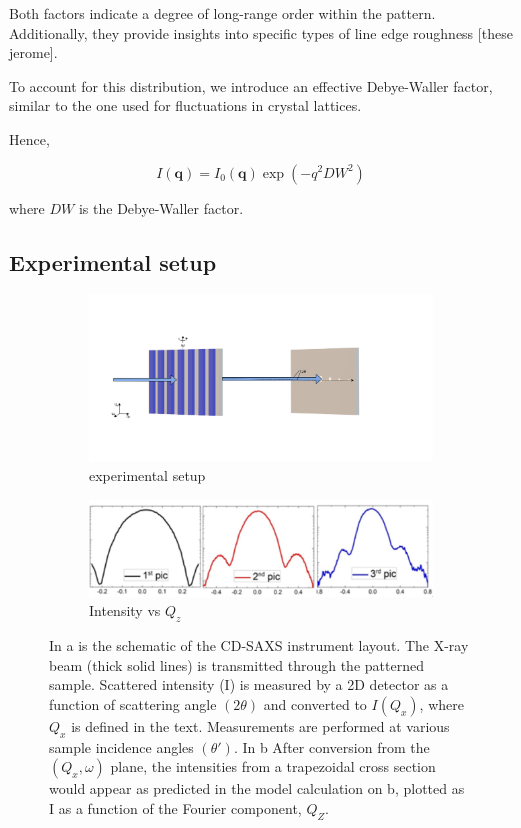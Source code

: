 Both factors indicate a degree of long-range order within the pattern. Additionally, they provide insights into specific types of line edge roughness [these jerome].

To account for this distribution, we introduce an effective Debye-Waller factor, similar to the one used for fluctuations in crystal lattices.

Hence,

\begin{equation}
    I(\mathbf{q}) = I_{0}(\mathbf{q}) \exp(-q^{2}DW^{2} )
\end{equation}

where $DW$ is the Debye-Waller factor.

\subsection{Experimental setup}
\begin{figure}[h]
    \centering
    \begin{subfigure}[b]{0.8\textwidth}
        \includegraphics[width=\textwidth]{images/cdsaxs_diff.png}
        \caption{experimental setup}
    \end{subfigure}
    
    \begin{subfigure}[b]{0.4\textwidth}
        \includegraphics[width=\textwidth]{images/intensity_qz.png}
        \caption{Intensity vs $Q_z$}
    \end{subfigure}
    
    \caption{In a is the schematic of the CD-SAXS instrument layout. The X-ray beam (thick solid lines) is transmitted through the 
    patterned sample. Scattered intensity (I) is measured by a 2D detector as a function of scattering angle $(2\theta)$ 
    and converted to $I(Q_{x})$, where $Q_{x}$ is defined in the text. Measurements are performed at various sample incidence 
    angles $(\theta')$. In b After conversion from the $(Q_{x},\omega)$
    plane, the intensities
   from a trapezoidal cross section would appear as predicted in
   the model calculation on b, plotted as I as a function of the
   Fourier component, $Q_{Z}$.}
   \label{fig:isolated_line}
\end{figure}

